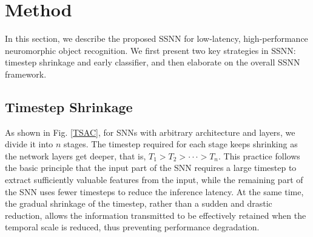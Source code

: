 \documentclass[letterpaper]{article} %
\begin{document}
\section{Method}
\label{Method}
In this section, we describe the proposed SSNN for low-latency, high-performance neuromorphic object recognition. We first present two key strategies in SSNN: timestep shrinkage and early classifier, and then elaborate on the overall SSNN framework.
\subsection{Timestep Shrinkage}
As shown in Fig. \ref{TSAC}, for SNNs with arbitrary architecture and layers, we divide it into $n$ stages.
The timestep required for each stage keeps shrinking as the network layers get deeper, that is, $T_1>T_2>\cdot \cdot \cdot>T_n$. This practice follows the basic principle that the input part of the SNN requires a large timestep to extract sufficiently valuable features from the input, while the remaining part of the SNN uses fewer timesteps to reduce the inference latency. At the same time, the gradual shrinkage of the timestep, rather than a sudden and drastic reduction, allows the information transmitted to be effectively retained when the temporal scale is reduced, thus preventing performance degradation.
\end{document}
